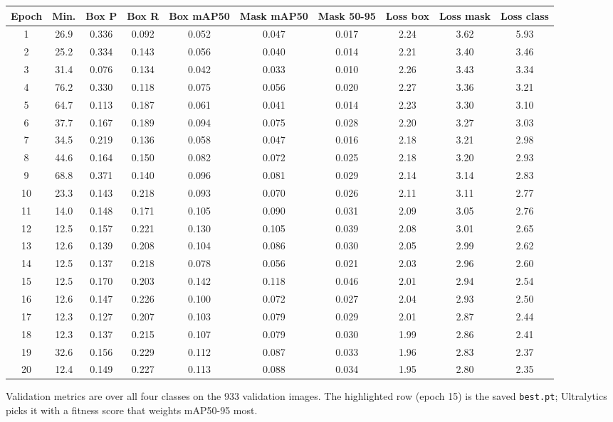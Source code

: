 \documentclass[11pt,a4paper]{article}
\newcommand{\code}[1]{\texttt{\small #1}}
\begin{document}
\begin{center}
\scriptsize\setlength{\tabcolsep}{4pt}
\begin{tabular}{cccccccccc}
\toprule
\textbf{Epoch} & \textbf{Min.} & \textbf{Box P} & \textbf{Box R} & \textbf{Box mAP50} & \textbf{Mask mAP50} & \textbf{Mask 50-95} & \textbf{Loss box} & \textbf{Loss mask} & \textbf{Loss class}\\
\midrule
1 & 26.9 & 0.336 & 0.092 & 0.052 & 0.047 & 0.017 & 2.24 & 3.62 & 5.93\\
2 & 25.2 & 0.334 & 0.143 & 0.056 & 0.040 & 0.014 & 2.21 & 3.40 & 3.46\\
3 & 31.4 & 0.076 & 0.134 & 0.042 & 0.033 & 0.010 & 2.26 & 3.43 & 3.34\\
4 & 76.2 & 0.330 & 0.118 & 0.075 & 0.056 & 0.020 & 2.27 & 3.36 & 3.21\\
5 & 64.7 & 0.113 & 0.187 & 0.061 & 0.041 & 0.014 & 2.23 & 3.30 & 3.10\\
6 & 37.7 & 0.167 & 0.189 & 0.094 & 0.075 & 0.028 & 2.20 & 3.27 & 3.03\\
7 & 34.5 & 0.219 & 0.136 & 0.058 & 0.047 & 0.016 & 2.18 & 3.21 & 2.98\\
8 & 44.6 & 0.164 & 0.150 & 0.082 & 0.072 & 0.025 & 2.18 & 3.20 & 2.93\\
9 & 68.8 & 0.371 & 0.140 & 0.096 & 0.081 & 0.029 & 2.14 & 3.14 & 2.83\\
10 & 23.3 & 0.143 & 0.218 & 0.093 & 0.070 & 0.026 & 2.11 & 3.11 & 2.77\\
11 & 14.0 & 0.148 & 0.171 & 0.105 & 0.090 & 0.031 & 2.09 & 3.05 & 2.76\\
12 & 12.5 & 0.157 & 0.221 & 0.130 & 0.105 & 0.039 & 2.08 & 3.01 & 2.65\\
13 & 12.6 & 0.139 & 0.208 & 0.104 & 0.086 & 0.030 & 2.05 & 2.99 & 2.62\\
14 & 12.5 & 0.137 & 0.218 & 0.078 & 0.056 & 0.021 & 2.03 & 2.96 & 2.60\\
\rowcolor{gmlight}15 & 12.5 & 0.170 & 0.203 & 0.142 & 0.118 & 0.046 & 2.01 & 2.94 & 2.54\\
16 & 12.6 & 0.147 & 0.226 & 0.100 & 0.072 & 0.027 & 2.04 & 2.93 & 2.50\\
17 & 12.3 & 0.127 & 0.207 & 0.103 & 0.079 & 0.029 & 2.01 & 2.87 & 2.44\\
18 & 12.3 & 0.137 & 0.215 & 0.107 & 0.079 & 0.030 & 1.99 & 2.86 & 2.41\\
19 & 32.6 & 0.156 & 0.229 & 0.112 & 0.087 & 0.033 & 1.96 & 2.83 & 2.37\\
20 & 12.4 & 0.149 & 0.227 & 0.113 & 0.088 & 0.034 & 1.95 & 2.80 & 2.35\\
\bottomrule
\end{tabular}
\end{center}
Validation metrics are over all four classes on the 933 validation images. The highlighted row (epoch 15) is the
saved \code{best.pt}; Ultralytics picks it with a fitness score that weights mAP50-95 most.
\end{document}
